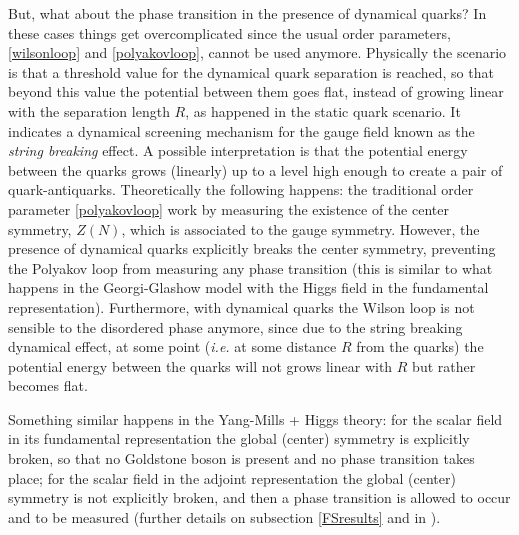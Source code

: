But, what about the phase transition in the presence of dynamical quarks? In these cases things
get overcomplicated since the usual order parameters, \eqref{wilsonloop} and
\eqref{polyakovloop}, cannot be used anymore. Physically the scenario is that a threshold value
for the dynamical quark separation is reached, so that beyond this value the potential between
them goes flat, instead of growing linear with the separation length $R$, as happened in the
static quark scenario. It indicates a dynamical screening mechanism for the gauge field
known as the \emph{string breaking} effect. A possible interpretation is that the potential
energy between the quarks grows (linearly) up to a level high enough to create a pair of
quark-antiquarks. Theoretically the following happens: the traditional order parameter
\eqref{polyakovloop} work by measuring the existence of the center
symmetry, $Z(N)$, which is associated to the gauge symmetry. However, the presence of
dynamical quarks explicitly breaks the center symmetry, preventing the Polyakov
loop from measuring any phase transition (this is similar to what happens in the
Georgi-Glashow model with the Higgs field in the fundamental representation). Furthermore,
with dynamical quarks the Wilson loop is not sensible to the disordered phase anymore, since
due to the string breaking dynamical effect, at some point ({\it i.e.} at some distance $R$ from
the quarks) the potential energy between the quarks will not grows linear with $R$ but rather
becomes flat.

Something similar happens in the Yang-Mills + Higgs theory: for the scalar field in its
fundamental representation the global (center) symmetry is explicitly broken, so that no
Goldstone boson is present and no phase transition takes place; for the scalar field
in the adjoint representation the global (center) symmetry is not explicitly broken, and then a
phase transition is allowed to occur and to be measured (further details on subsection
\ref{FSresults} and in \cite{Greensite:2011zz}).


